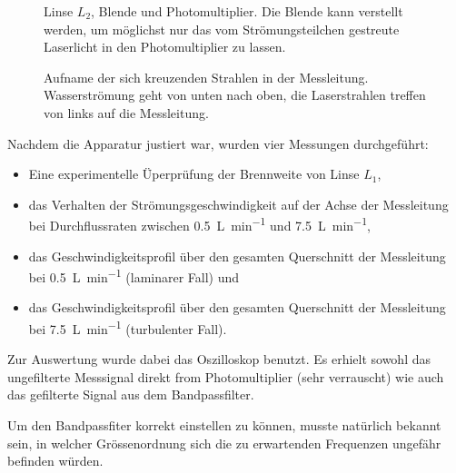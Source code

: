 \begin{figure}[h!t]
    \centering
    \resizebox{.6\textwidth}{!}{}
    \caption{%
        Linse  $L_2$, Blende  und Photomultiplier. Die  Blende kann  verstellt
        werden,  um  m\"oglichst  nur  das  vom Str\"omungsteilchen  gestreute
        Laserlicht in den Photomultiplier zu lassen.
    }
    \label{fig:versuchsanordnung:blende}
\end{figure}


\begin{figure}[h!t]
    \centering
    \resizebox{.67\textwidth}{!}{}
    \caption{%
        Aufname      der     sich      kreuzenden     Strahlen      in     der
        Messleitung. Wasserstr\"omung   geht   von   unten  nach   oben,   die
        Laserstrahlen treffen von links auf die Messleitung.
    }
    \label{fig:laserkreuzung}
\end{figure}


\clearpage
Nachdem die Apparatur justiert war, wurden vier Messungen durchgef\"uhrt:

\begin{itemize}
    \item
        Eine experimentelle \"Uperpr\"ufung der Brennweite von Linse $L_1$,
    \item
        das  Verhalten  der  Str\"omungsgeschwindigkeit   auf  der  Achse  der
        Messleitung  bei Durchflussraten  zwischen \SI{0.5}{\liter\per\minute}
        und \SI{7.5}{\liter\per\minute},
    \item
        das  Geschwindigkeitsprofil   \"uber  den  gesamten   Querschnitt  der
        Messleitung bei \SI{0.5}{\liter\per\minute} (laminarer Fall) und
    \item
        das  Geschwindigkeitsprofil   \"uber  den  gesamten   Querschnitt  der
        Messleitung bei \SI{7.5}{\liter\per\minute} (turbulenter Fall).
\end{itemize}

Zur  Auswertung wurde  dabei das  Oszilloskop benutzt. Es  erhielt sowohl  das
ungefilterte Messsignal direkt from Photomultiplier (sehr verrauscht) wie auch
das gefilterte Signal aus dem Bandpassfilter.

Um  den  Bandpassfiter  korrekt  einstellen zu  k\"onnen,  musste  nat\"urlich
bekannt sein, in  welcher Gr\"ossenordnung sich die  zu erwartenden Frequenzen
ungef\"ahr befinden w\"urden.

